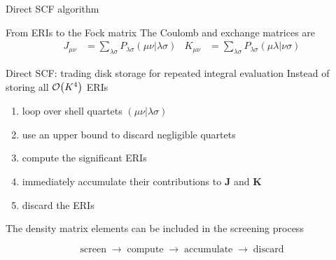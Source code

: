 \documentclass[aspectratio=169,9pt]{beamer}
\newcommand{\bJ}{\boldsymbol{J}}
\newcommand{\bK}{\boldsymbol{K}}
\newcommand{\si}{\sigma}
\newcommand{\la}{\lambda}
\newcommand{\rbraket}[2]{( #1 | #2 )}
\begin{document}
\begin{frame}{Direct SCF algorithm}
	\begin{block}{From ERIs to the Fock matrix}
		The Coulomb and exchange matrices are
		\begin{align*}
			J_{\mu\nu}
			& =
			\sum_{\lambda\sigma}
			P_{\lambda\sigma}
			\rbraket{\mu\nu}{\lambda\sigma}
			&
			K_{\mu\nu}
			& =
			\sum_{\lambda\sigma}
			P_{\lambda\sigma}
			\rbraket{\mu\lambda}{\nu\sigma}
		\end{align*}
	\end{block}
	\vfill
	\begin{block}{Direct SCF: trading disk storage for repeated integral evaluation}
		Instead of storing all $\order{K^4}$ ERIs
		\begin{enumerate}
			\item loop over shell quartets $\rbraket{\mu\nu}{\la\si}$
			\item use an upper bound to discard negligible quartets
			\item compute the significant ERIs
			\item immediately accumulate their contributions to $\bJ$ and $\bK$
			\item discard the ERIs
		\end{enumerate}
		\alert{The density matrix elements can be included in the screening process}
	\end{block}
	\vfill
	\begin{equation*}
		\boxed{
			\text{screen}
			\;\longrightarrow\;
			\text{compute}
			\;\longrightarrow\;
			\text{accumulate}
			\;\longrightarrow\;
			\text{discard}
		}
	\end{equation*}
\end{frame}
\end{document}
